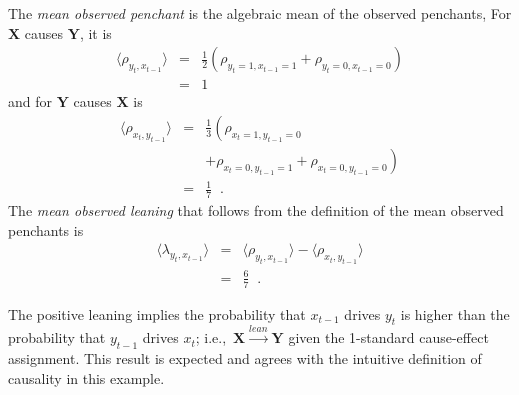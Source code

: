 \documentclass[twocolumn,aps,pre,groupedaddress]{revtex4-1}
\begin{document}
The {\em mean observed penchant} is the algebraic mean of the observed penchants,  For $\mathbf{X}$ causes $\mathbf{Y}$, it is
\begin{eqnarray*}
\langle \rho_{y_t,x_{t-1}} \rangle &=& \frac{1}{2}\left(\rho_{y_t=1,x_{t-1}=1} + \rho_{y_t=0,x_{t-1}=0}\right)\\
&=& 1
\end{eqnarray*}
and for $\mathbf{Y}$ causes $\mathbf{X}$ is
\begin{eqnarray*}
\langle \rho_{x_t,y_{t-1}} \rangle &=& \frac{1}{3}\left(\rho_{x_t=1,y_{t-1}=0} \right.\\
& &\left. +\rho_{x_t=0,y_{t-1}=1} + \rho_{x_t=0,y_{t-1}=0}\right)\\
&=& \frac{1}{7}\;\;.
\end{eqnarray*}
The {\em mean observed leaning} that follows from the definition of the mean observed penchants is
\begin{eqnarray}
\label{eqn:meanlean}
\langle \lambda_{y_t,x_{t-1}} \rangle &=& \langle \rho_{y_t,x_{t-1}} \rangle - \langle \rho_{x_t,y_{t-1}} \rangle\\
&=& \frac{6}{7}\;\;.
\end{eqnarray}

The positive leaning implies the probability that $x_{t-1}$ drives $y_t$ is higher than the probability that $y_{t-1}$ drives $x_{t}$; i.e.,\ $\mathbf{X}\xrightarrow{lean}\mathbf{Y}$ given the 1-standard cause-effect assignment.  This result is expected and agrees with the intuitive definition of causality in this example.  
\end{document}
